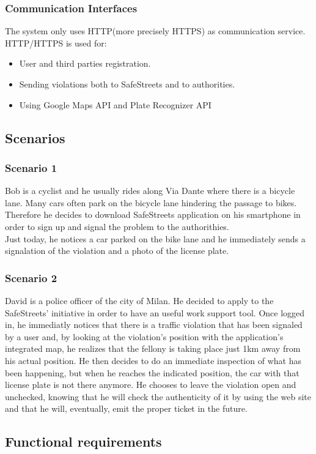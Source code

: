 \documentclass{article}
\begin{document}
\subsubsection{Communication Interfaces}
The system only uses HTTP(more precisely HTTPS) as communication service.
HTTP/HTTPS is used for:
\begin{itemize}
    \item User and third parties registration.
    \item Sending violations both to SafeStreets and to authorities.
    \item Using Google Maps API and Plate Recognizer API
\end{itemize}
\subsection{Scenarios}
\subsubsection{Scenario 1}
Bob is a cyclist and he usually rides along Via Dante where there is a bicycle
lane. Many cars often park on the bicycle lane hindering the passage to bikes.
Therefore he decides to download SafeStreets application on his smartphone in
order to sign up and signal the problem to the authorithies.\\ Just today, he
notices a car parked on the bike lane and he immediately sends a signalation of
the violation and a photo of the license plate.
\subsubsection{Scenario 2}
David is a police officer of the city of Milan. He decided to apply to the
SafeStreets’ initiative in order to have an useful work support tool. Once
logged in, he immediatly notices that there is a traffic violation that has been
signaled by a user and, by looking at the violation’s position with the
application’s integrated map, he realizes that the fellony is taking place just
1km away from his actual position. He then decides to do an immediate inspection
of what has been happening, but when he reaches the indicated position, the car
with that license plate is not there anymore. He chooses to leave the violation
open and unchecked, knowing that he will check the authenticity of it by using
the web site and that he will, eventually, emit the proper ticket in the future.


\newpage
\subsection{Functional requirements}
\end{document}
